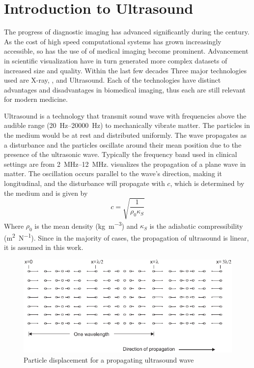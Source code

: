 \chapter{Introduction to Ultrasound} \label{cha:introduction}
The progress of diagnostic imaging has advanced significantly during the  century. As the cost of high speed computational systems has grown increasingly accessible, so has the use of of medical imaging become prominent. Advancement in scientific visualization have in turn generated more complex datasets of increased size and quality. Within the last few decades
Three major technologies used are X-ray, , and Ultrasound. Each of the technologies have distinct advantages and disadvantages in biomedical imaging, thus each are still relevant for modern medicine. 

Ultrasound is a technology that transmit sound wave with frequencies above the audible range (\SIrange{20}{20000}{\hertz}) to mechanically vibrate matter. The particles in the medium would be at rest and distributed uniformly. The wave propagates as a disturbance and the particles oscillate around their mean position due to the presence of the ultrasonic wave. Typically the frequency band used in clinical settings are from \SIrange{2}{12}{\mega\hertz}.  visualizes the propagation of a plane wave in matter. The oscillation occurs parallel to the wave's direction, making it longitudinal, and the disturbance will propagate with $c$, which is determined by the medium and is given by
\begin{equation}
	c = \sqrt{\frac{1}{\rho_{0} \kappa_{S}}}
\end{equation}
Where $\rho_{0}$ is the mean density (\si{\kilogram\per\meter\cubed}) and $\kappa_{S}$ is the adiabatic compressibility (\si{\meter\squared\per\newton}). Since in the majority of cases, the propagation of ultrasound is linear, it is assumed in this work. 

\begin{figure}[ht]
	\centering
	\includegraphics[width=.6\textwidth]{Figures/plane_wave_jensen-cropped.pdf}
	\caption{Particle displacement for a propagating ultrasound wave \cite{JensenUltrasoundBook}}
	\label{fig:planewave_jensen}
\end{figure}

